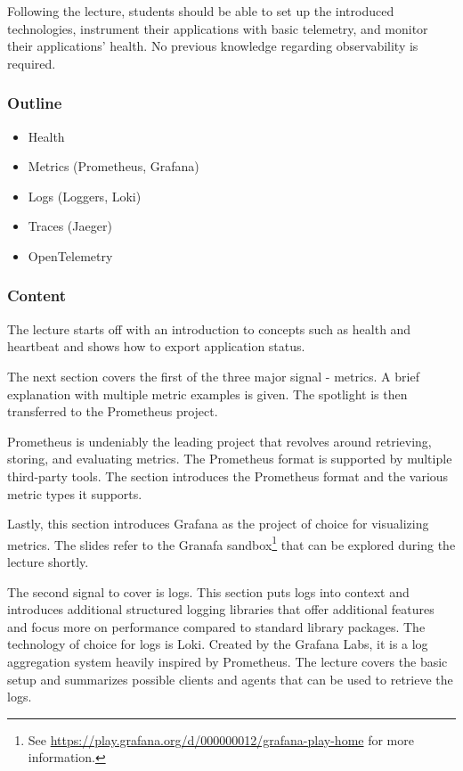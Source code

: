 \documentclass[
  digital,
  color,
  oneside,
  nosansbold,
  nocolorbold,
  lof,
  nolot,
]{fithesis4}
\begin{document}
Following the lecture, students should be able to set up the introduced technologies, instrument their applications with basic telemetry, and monitor their applications' health. No previous knowledge regarding observability is required.

\subsubsection{Outline}

\begin{itemize}
    \item Health
    \item Metrics (Prometheus, Grafana)
    \item Logs (Loggers, Loki)
    \item Traces (Jaeger)
    \item OpenTelemetry
\end{itemize}

\subsubsection{Content}

The lecture starts off with an introduction to concepts such as health and heartbeat and shows how to export application status.

The next section covers the first of the three major signal - metrics. A brief explanation with multiple metric examples is given. The spotlight is then transferred to the Prometheus project.

Prometheus\cite{prometheus} is undeniably the leading project that revolves around retrieving, storing, and evaluating metrics. The Prometheus format is supported by multiple third-party tools. The section introduces the Prometheus format and the various metric types it supports.

Lastly, this section introduces Grafana\cite{grafana} as the project of choice for visualizing metrics. The slides refer to the Granafa sandbox\footnote{See \url{https://play.grafana.org/d/000000012/grafana-play-home} for more information.}
that can be explored during the lecture shortly.

The second signal to cover is logs. This section puts logs into context and introduces additional structured logging libraries that offer additional features and focus more on performance compared to standard library packages.
The technology of choice for logs is Loki\cite{loki}. Created by the Grafana Labs, it is a log aggregation system heavily inspired by Prometheus. The lecture covers the basic setup and summarizes possible clients and agents that can be used to retrieve the logs.
\end{document}
